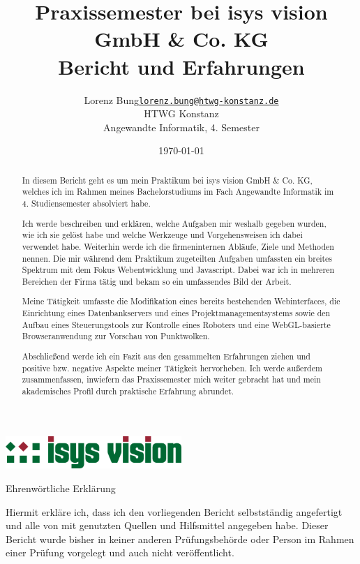 \documentclass[xcolor=dvipsnames,11pt,paper=a4paper]{report}
\title{
	\Huge\textbf{Praxissemester bei isys vision GmbH \& Co. KG}\\\vspace{20pt}
	\huge{Bericht und Erfahrungen}
}
\author{
	\begin{tabular}{l l}
	Lorenz Bung &
	\href{mailto:lorenz.bung@htwg-konstanz.de}{\texttt{lorenz.bung@htwg-konstanz.de}}\\
	&HTWG Konstanz\\
	&Angewandte Informatik, 4. Semester
	\end{tabular}
}
\date{\today}
\begin{document}

\begin{titlepage}
\raggedright\includegraphics[width=0.5\textwidth]{media/isys.png}
{\let\newpage\relax\maketitle}
\end{titlepage}

\begin{abstract}
In diesem Bericht geht es um mein Praktikum bei isys vision GmbH \& Co. KG, welches
ich im Rahmen meines Bachelorstudiums im Fach Angewandte Informatik im 4. Studiensemester
absolviert habe.

Ich werde beschreiben und erklären, welche Aufgaben mir weshalb gegeben wurden,
wie ich sie gelöst habe und welche Werkzeuge und Vorgehensweisen ich dabei verwendet
habe. Weiterhin werde ich die firmeninternen Abläufe, Ziele und Methoden nennen.
Die mir während dem Praktikum zugeteilten Aufgaben umfassten ein breites Spektrum mit dem Fokus
Webentwicklung und Javascript. Dabei war ich in mehreren Bereichen der Firma
tätig und bekam so ein umfassendes Bild der Arbeit.

Meine Tätigkeit umfasste die Modifikation eines bereits bestehenden Webinterfaces, die Einrichtung eines Datenbankservers und eines Projektmanagementsystems sowie den Aufbau eines Steuerungstools zur Kontrolle eines Roboters und eine WebGL-basierte Browseranwendung zur Vorschau von Punktwolken.

Abschließend werde ich ein Fazit aus den gesammelten Erfahrungen ziehen und positive
bzw. negative Aspekte meiner Tätigkeit hervorheben. Ich werde außerdem zusammenfassen,
inwiefern das Praxissemester mich weiter gebracht hat und mein akademisches Profil
durch praktische Erfahrung abrundet.
\end{abstract}
\pagebreak

Ehrenwörtliche Erklärung

Hiermit erkläre ich, dass ich den vorliegenden Bericht selbstständig angefertigt und alle von mit genutzten Quellen und Hilfsmittel angegeben habe. Dieser Bericht wurde bisher in keiner anderen Prüfungsbehörde oder Person im Rahmen einer Prüfung vorgelegt und auch nicht veröffentlicht.
\pagebreak
\end{document}

